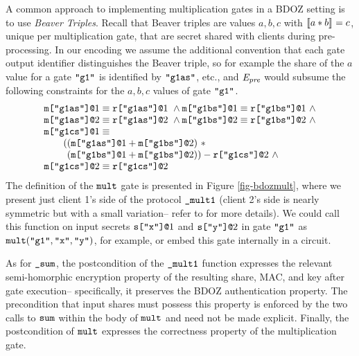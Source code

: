 A common approach to implementing multiplication gates in a BDOZ
setting is to use \emph{Beaver Triples}. Recall that Beaver triples
are values $a,b,c$ with $\llbracket a * b \rrbracket_{} = c$, unique per multiplication
gate, that are secret shared with clients during pre-processing.
In our encoding we assume the additional convention that each gate
output identifier distinguishes the Beaver triple, so for
example the share of the $a$ value for a gate $\texttt{"g1"}$
is identified by $\texttt{"g1as"}$, etc., and $\mathit{E}_{\mathit{pre}}$ would
subsume the following constraints for the $a,b,c$ values of
gate $\texttt{"g1"}$.
{\footnotesize$$
\begin{array}{l}
\texttt{m[}\texttt{"g1as"}\texttt{]}\texttt{@}1 \equiv \texttt{r[}\texttt{"g1as"}\texttt{]}\texttt{@}1\ \wedge 
\texttt{m[}\texttt{"g1bs"}\texttt{]}\texttt{@}1 \equiv \texttt{r[}\texttt{"g1bs"}\texttt{]}\texttt{@}1\ \wedge\\
\texttt{m[}\texttt{"g1as"}\texttt{]}\texttt{@}2 \equiv \texttt{r[}\texttt{"g1as"}\texttt{]}\texttt{@}2\ \wedge 
\texttt{m[}\texttt{"g1bs"}\texttt{]}\texttt{@}2 \equiv \texttt{r[}\texttt{"g1bs"}\texttt{]}\texttt{@}2\ \wedge\\
\texttt{m[}\texttt{"g1cs"}\texttt{]}\texttt{@}1 \equiv \\
\qquad ((\texttt{m[}\texttt{"g1as"}\texttt{]}\texttt{@}1 + \texttt{m[}\texttt{"g1bs"}\texttt{]}\texttt{@}2)\ *\\
\qquad\phantom{(}(\texttt{m[}\texttt{"g1bs"}\texttt{]}\texttt{@}1 + \texttt{m[}\texttt{"g1bs"}\texttt{]}\texttt{@}2)) - \texttt{r[}\texttt{"g1cs"}\texttt{]}\texttt{@}2\ \wedge\\
\texttt{m[}\texttt{"g1cs"}\texttt{]}\texttt{@}2 \equiv \texttt{r[}\texttt{"g1cs"}\texttt{]}\texttt{@}2
\end{array}
$$}
The definition of the $\texttt{mult}$ gate is presented in Figure
\ref{fig-bdozmult}, where we present just client 1's side of the
protocol $\texttt{\_mult1}$ (client 2's side is nearly symmetric but with
a small variation-- refer to
\cite{evans2018pragmatic,10.1007/978-3-030-68869-1_3} for more
details).  We could call this function on input secrets
$\texttt{s[}\texttt{"x"}\texttt{]}\texttt{@}1$ and $\texttt{s[}\texttt{"y"}\texttt{]}\texttt{@}2$ in gate $\texttt{"g1"}$ as
$\texttt{mult}(\texttt{"g1"},\texttt{"x"},\texttt{"y"})$, for example, or embed
this gate internally in a circuit.

As for $\texttt{\_sum}$, the postcondition of the $\texttt{\_mult1}$
function expresses the relevant semi-homorphic encryption property of
the resulting share, MAC, and key after gate execution-- specifically,
it preserves the BDOZ authentication property. The precondition that
input shares must possess this property is enforced by the two calls
to $\texttt{sum}$ within the body of $\texttt{mult}$ and need not be made
explicit. Finally, the postcondition of $\texttt{mult}$ expresses the
correctness property of the multiplication gate.


